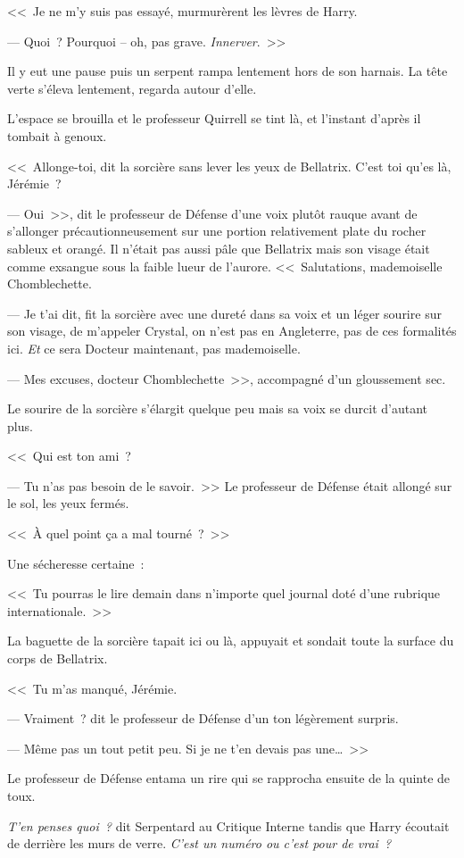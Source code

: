 <<~Je ne m'y suis pas essayé, murmurèrent les lèvres de Harry.

--- Quoi~? Pourquoi -- oh, pas grave. \emph{Innerver}.~>>

Il y eut une pause puis un serpent rampa lentement hors de son harnais. La tête verte s'éleva lentement, regarda autour d'elle.

L'espace se brouilla et le professeur Quirrell se tint là, et l'instant d'après il tombait à genoux.

<<~Allonge-toi, dit la sorcière sans lever les yeux de Bellatrix. C'est toi qu'es là, Jérémie~?

--- Oui~>>, dit le professeur de Défense d'une voix plutôt rauque avant de s'allonger précautionneusement sur une portion relativement plate du rocher sableux et orangé. Il n'était pas aussi pâle que Bellatrix mais son visage était comme exsangue sous la faible lueur de l'aurore. <<~Salutations, mademoiselle Chomblechette.

--- Je t'ai dit, fit la sorcière avec une dureté dans sa voix et un léger sourire sur son visage, de m'appeler Crystal, on n'est pas en Angleterre, pas de ces formalités ici. \emph{Et} ce sera Docteur maintenant, pas mademoiselle.

--- Mes excuses, docteur Chomblechette~>>, accompagné d'un gloussement sec.

Le sourire de la sorcière s'élargit quelque peu mais sa voix se durcit d'autant plus.

<<~Qui est ton ami~?

--- Tu n'as pas besoin de le savoir.~>> Le professeur de Défense était allongé sur le sol, les yeux fermés.

<<~À quel point ça a mal tourné~?~>>

Une sécheresse certaine~:

<<~Tu pourras le lire demain dans n'importe quel journal doté d'une rubrique internationale.~>>

La baguette de la sorcière tapait ici ou là, appuyait et sondait toute la surface du corps de Bellatrix.

<<~Tu m'as manqué, Jérémie.

--- Vraiment~? dit le professeur de Défense d'un ton légèrement surpris.

--- Même pas un tout petit peu. Si je ne t'en devais pas une…~>>

Le professeur de Défense entama un rire qui se rapprocha ensuite de la quinte de toux.

\emph{T'en penses quoi~?} dit Serpentard au Critique Interne tandis que Harry écoutait de derrière les murs de verre. \emph{C'est un numéro ou c'est pour de vrai~?}


